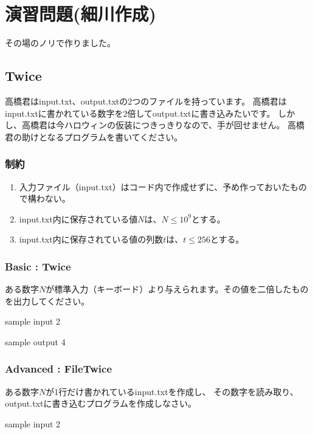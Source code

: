 \section{演習問題(細川作成)}
	
	その場のノリで作りました。
	
	\subsection{Twice}
		高橋君はinput.txt、output.txtの2つのファイルを持っています。
		高橋君はinput.txtに書かれている数字を2倍してoutput.txtに書き込みたいです。
		しかし、高橋君は今ハロウィンの仮装につきっきりなので、手が回せません。
		高橋君の助けとなるプログラムを書いてください。
		
	\subsubsection{制約}
		\begin{enumerate}
			\item 入力ファイル（input.txt）はコード内で作成せずに、予め作っておいたもので構わない。
			\item input.txt内に保存されている値$N$は、$N \le 10^9$とする。
			\item input.txt内に保存されている値の列数$t$は、$t \le 256$とする。
		\end{enumerate}

	\subsubsection{Basic : Twice}
		ある数字$N$が標準入力（キーボード）より与えられます。その値を二倍したものを出力してください。
		
		\begin{itembox}{sample input}
			2
		\end{itembox}
		
		\begin{itembox}{sample output}
			4
		\end{itembox}

	\subsubsection{Advanced : FileTwice}
		ある数字$N$が1行だけ書かれているinput.txtを作成し、
		その数字を読み取り、output.txtに書き込むプログラムを作成しなさい。
		
		\begin{itembox}{sample input}
			2
		\end{itembox}
		
